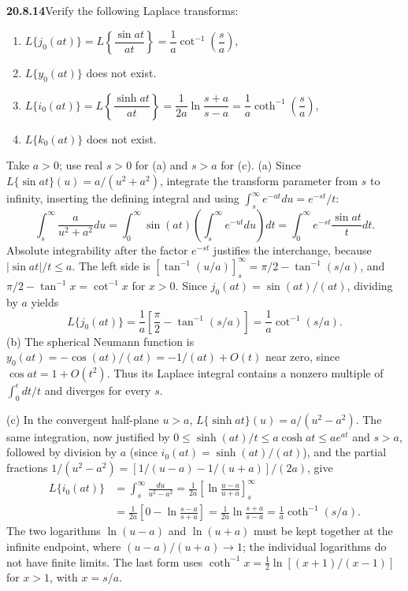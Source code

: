 \par\bigskip
\noindent\textbf{20.8.14}\quad Verify the following Laplace
transforms:
\begin{enumerate}
\item[(a)] $L\{j_{0}(at)\}=L\left\{\dfrac{\sin at}{at}\right\}
=\dfrac{1}{a}\cot^{-1}\left(\dfrac{s}{a}\right)$,
\item[(b)] $L\{y_{0}(at)\}$ does not exist.
\item[(c)] $L\{i_{0}(at)\}=L\left\{\dfrac{\sinh at}{at}\right\}
=\dfrac{1}{2a}\ln\dfrac{s+a}{s-a}
=\dfrac{1}{a}\coth^{-1}\left(\dfrac{s}{a}\right)$,
\item[(d)] $L\{k_{0}(at)\}$ does not exist.
\end{enumerate}
\par{}
\solution
Take $a>0$; use real $s>0$ for (a) and $s>a$ for (c).
(a) Since $L\{\sin at\}(u)=a/(u^2+a^2)$, integrate the
transform parameter from $s$ to infinity, inserting the
defining integral and using $\int_s^\infty e^{-ut}du=e^{-st}/t$:
\[
\int_s^\infty\frac a{u^2+a^2}du
=\int_0^\infty\sin(at)\left(\int_s^\infty e^{-ut}du\right)dt
=\int_0^\infty e^{-st}\frac{\sin at}{t}dt.
\]
Absolute integrability after the factor $e^{-st}$ justifies
the interchange, because $|\sin at|/t\le a$. The left side is
$[\tan^{-1}(u/a)]_s^\infty=\pi/2-\tan^{-1}(s/a)$, and
$\pi/2-\tan^{-1}x=\cot^{-1}x$ for $x>0$. Since
$j_0(at)=\sin(at)/(at)$, dividing by $a$ yields
\[
\boxed{L\{j_0(at)\}=
\frac1a\left[\frac\pi2-\tan^{-1}(s/a)\right]
=\frac1a\cot^{-1}(s/a)}.
\]
(b) The spherical Neumann function is
$y_0(at)=-\cos(at)/(at)=-1/(at)+O(t)$ near zero, since
$\cos at=1+O(t^2)$.
Thus its Laplace integral contains a nonzero multiple of
$\int_0^\epsilon dt/t$ and diverges for every $s$.

(c) In the convergent half-plane $u>a$,
$L\{\sinh at\}(u)=a/(u^2-a^2)$. The same integration, now
justified by $0\le\sinh(at)/t\le a\cosh at\le ae^{at}$ and
$s>a$, followed by division by $a$ (since
$i_0(at)=\sinh(at)/(at)$), and the partial fractions
$1/(u^2-a^2)=[1/(u-a)-1/(u+a)]/(2a)$, give
\begin{align*}
L\{i_0(at)\}
&=\int_s^\infty\frac{du}{u^2-a^2}
=\frac1{2a}\left[\ln\frac{u-a}{u+a}\right]_s^\infty\\
&=\frac1{2a}\left[0-\ln\frac{s-a}{s+a}\right]
=\boxed{\frac1{2a}\ln\frac{s+a}{s-a}
=\frac1a\coth^{-1}(s/a)}.
\end{align*}
The two logarithms $\ln(u-a)$ and $\ln(u+a)$ must be kept
together at the infinite endpoint, where $(u-a)/(u+a)\to1$;
the individual logarithms do not have finite limits. The last
form uses $\coth^{-1}x=\frac12\ln[(x+1)/(x-1)]$ for $x>1$, with
$x=s/a$.

